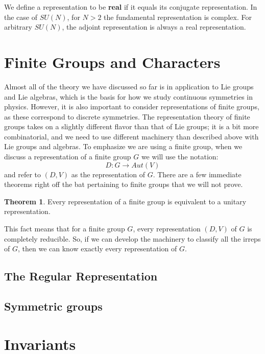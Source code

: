 \documentclass[11pt, oneside]{article}   	%
\theoremstyle{definition}
\newtheorem{theorem}{Theorem}[section]
\begin{document}
We define a representation to be \textbf{real} if it equals its conjugate representation. In the case of $SU(N)$, for $N > 2$ the 
fundamental representation is complex. For arbitrary $SU(N)$, the adjoint representation is always a real representation. 

\newpage
\section{Finite Groups and Characters}

Almost all of the theory we have discussed so far is in application to Lie groups and Lie algebras, which is the basis for how we 
study continuous symmetries in physics. However, it is also important to consider representations of finite groups, as these 
correspond to discrete symmetries. The representation theory of finite groups takes on a slightly different flavor than that of 
Lie groups; it is a bit more combinatorial, and we need to use different machinery than described above with Lie groups and 
algebras. To emphasize we are using a finite group, when we discuss a representation of a finite group $G$ we will use the 
notation:
\begin{equation}
	D : G\rightarrow Aut(V)
\end{equation}
and refer to $(D, V)$ as the representation of $G$. There are a few immediate theorems right off the bat pertaining to finite groups 
that we will not prove.
\begin{theorem}
	Every representation of a finite group is equivalent to a unitary representation.
\end{theorem}
This fact means that for a finite group $G$, every representation $(D, V)$ of $G$ is completely reducible. So, if we can 
develop the machinery to classify all the irreps of $G$, then we can know exactly every representation of $G$. 

\subsection{The Regular Representation}

\subsection{Symmetric groups}

\section{Invariants}
\end{document}
